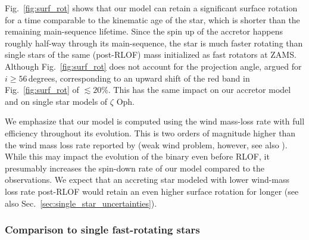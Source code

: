 \documentclass[twocolumn,twocolappendix,trackchanges]{aastex63}
\DeclareRobustCommand{\Figref}[1]{Fig.~\ref{#1}}
\DeclareRobustCommand{\Secref}[1]{Sec.~\ref{#1}}
\newcommand{\zoph}{$\zeta$ Oph}
\begin{document}
\Figref{fig:surf_rot} shows that our model can retain a significant surface rotation for a time comparable to the kinematic age of the star, which is shorter than the remaining main-sequence lifetime. Since the spin up of the accretor happens roughly half-way through its main-sequence, the star is much faster rotating than single stars of the same (post-RLOF) mass initialized as fast rotators at ZAMS. Although \Figref{fig:surf_rot} does not account for the projection angle, \cite{zehe:18} argued for
$i\geq56$\,degrees, corresponding to an upward shift of the red band in \Figref{fig:surf_rot} of $\lesssim
20\%$. This has the same impact on our accretor model and on single star models of \zoph.

We emphasize that our model is computed using the \cite{vink:00,
  vink:01} wind mass-loss rate with full efficiency throughout its
evolution. This is two orders of magnitude higher than the wind mass
loss rate reported by \cite{marcolino:09} (weak wind problem,
however, see also \citealt{lucy:12, lagae:21}). While this may impact
the evolution of the binary even before RLOF, it presumably increases the
spin-down rate of our model compared to the observations. We expect
that an accreting star modeled with lower wind-mass loss rate
post-RLOF would retain an even higher surface rotation for longer (see
also \Secref{sec:single_star_uncertainties}).


\subsubsection{Comparison to single fast-rotating stars}
\end{document}
